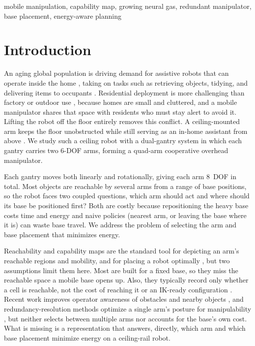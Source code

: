 \documentclass[conference]{IEEEtran}
\begin{document}
\begin{IEEEkeywords}
mobile manipulation, capability map, growing neural gas, redundant manipulator,
base placement, energy-aware planning
\end{IEEEkeywords}

\section{Introduction}

An aging global population is driving demand for assistive robots that
can operate inside the home \cite{unitednations2024world}, taking on
tasks such as retrieving objects, tidying, and delivering items to occupants
\cite{Lisondra2026}. Residential deployment is more challenging than factory or outdoor
use \cite{kemp2007challenges}, because homes are small and cluttered, and a mobile
manipulator shares that space with residents who must stay alert to avoid it.
Lifting the robot off the floor entirely \cite{Lalonde2025}
removes this conflict. A ceiling-mounted arm keeps the floor unobstructed while still
serving as an in-home assistant from above \cite{Kaluarachchi2025}. We study such a
ceiling robot with a dual-gantry system in which each gantry carries two 6-DOF arms,
forming a quad-arm cooperative overhead manipulator.

Each gantry moves both linearly and rotationally, giving each arm 8~DOF
in total. Most objects are reachable by several arms from a range of base positions,
so the robot faces two coupled questions, which arm should act and where should its
base be positioned first? Both are costly because repositioning the heavy base costs time
and energy \cite{MoMaPos2024,BaSeNet2024,EnergySLR2024} and naive policies (nearest
arm, or leaving the base where it is) can waste base travel. We address the problem
of selecting the arm and base placement that minimizes energy.

Reachability and capability maps are the standard tool for depicting an
arm's reachable regions and mobility, and for placing a robot optimally
\cite{Zacharias2007,Makhal2018}, but two assumptions limit them here. Most are built
for a fixed base, so they miss the reachable space a mobile base opens up. Also, they
typically record only whether a cell is reachable, not the cost of reaching it or an
IK-ready configuration \cite{Zacharias2007}. Recent work improves operator awareness
of obstacles and nearby objects \cite{MoMaPos2024}, and
redundancy-resolution methods optimize a single arm's posture for manipulability
\cite{Yoshikawa1985}, but neither selects between multiple arms nor accounts for the
base's own cost. What is missing is a representation that answers, directly, which
arm and which base placement minimize energy on a ceiling-rail robot.
\end{document}

